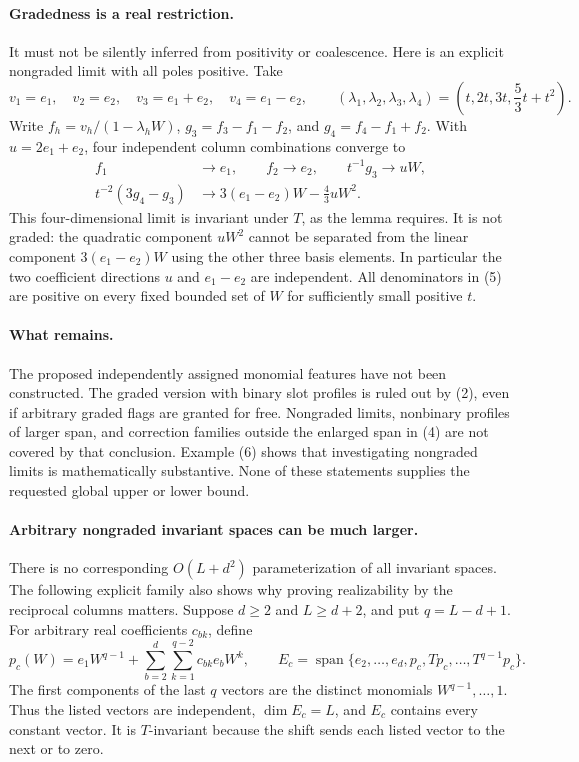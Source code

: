 \documentclass[11pt]{article}
\begin{document}
\paragraph{Gradedness is a real restriction.}
It must not be silently inferred from positivity or coalescence.
Here is an explicit nongraded limit with all poles positive. Take
\[
 v_1=e_1,\quad v_2=e_2,\quad v_3=e_1+e_2,\quad v_4=e_1-e_2,
 \qquad
 (\lambda_1,\lambda_2,\lambda_3,\lambda_4)
 =\left(t,2t,3t,\frac53t+t^2\right).
 \tag{5}
\]
Write $f_h=v_h/(1-\lambda_hW)$,
$g_3=f_3-f_1-f_2$, and $g_4=f_4-f_1+f_2$.
With $u=2e_1+e_2$, four independent column combinations converge to
\[
 \begin{split}
       f_1&\longrightarrow e_1,\qquad
       f_2\longrightarrow e_2,\qquad
       t^{-1}g_3\longrightarrow uW,\\
       t^{-2}(3g_4-g_3)
           &\longrightarrow3(e_1-e_2)W-\frac43uW^2.
 \end{split}
 \tag{6}
\]
This four-dimensional limit is invariant under $T$, as the lemma
requires. It is not graded: the quadratic component $uW^2$ cannot
be separated from the linear component $3(e_1-e_2)W$ using the
other three basis elements. In particular the two coefficient
directions $u$ and $e_1-e_2$ are independent. All denominators in
(5) are positive on every fixed bounded set of $W$ for sufficiently
small positive $t$.

\paragraph{What remains.}
The proposed independently assigned monomial features have not been
constructed. The graded version with binary slot profiles is ruled
out by (2), even if arbitrary graded flags are granted for free.
Nongraded limits, nonbinary profiles of larger span, and correction
families outside the enlarged span in (4) are not covered by that
conclusion. Example (6) shows that investigating nongraded limits
is mathematically substantive. None of these statements supplies
the requested global upper or lower bound.

\paragraph{Arbitrary nongraded invariant spaces can be much larger.}
There is no corresponding $O(L+d^2)$ parameterization of all invariant
spaces. The following explicit family also shows why proving
realizability by the reciprocal columns matters. Suppose $d\geq2$ and
$L\geq d+2$, and put $q=L-d+1$. For arbitrary real coefficients $c_{bk}$,
define
\[
 p_c(W)=e_1W^{q-1}
       +\sum_{b=2}^d\sum_{k=1}^{q-2}c_{bk}e_bW^k,
 \qquad
 E_c=\operatorname{span}\{e_2,\ldots,e_d,p_c,Tp_c,\ldots,T^{q-1}p_c\}.
 \tag{7}
\]
The first components of the last $q$ vectors are the distinct monomials
$W^{q-1},\ldots,1$. Thus the listed vectors are independent,
$\dim E_c=L$, and $E_c$ contains every constant vector.
It is $T$-invariant because the shift sends each listed vector to the
next or to zero.
\end{document}
